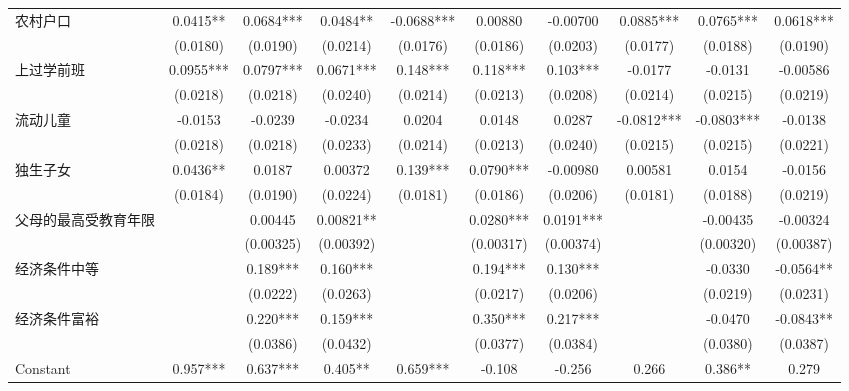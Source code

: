 \documentclass{beamer}
\begin{document}
\begin{frame}
\begin{table}[!htbp]
{\begin{tabular}{lccccccccc}
农村户口          & 0.0415**   & 0.0684***  & 0.0484**   & -0.0688*** & 0.00880    & -0.00700  & 0.0885***  & 0.0765***  & 0.0618*** \\
             & (0.0180)   & (0.0190)   & (0.0214)   & (0.0176)   & (0.0186)   & (0.0203)  & (0.0177)   & (0.0188)   & (0.0190)  \\
上过学前班        & 0.0955***  & 0.0797***  & 0.0671***  & 0.148***   & 0.118***   & 0.103***  & -0.0177    & -0.0131    & -0.00586  \\
             & (0.0218)   & (0.0218)   & (0.0240)   & (0.0214)   & (0.0213)   & (0.0208)  & (0.0214)   & (0.0215)   & (0.0219)  \\
流动儿童         & -0.0153    & -0.0239    & -0.0234    & 0.0204     & 0.0148     & 0.0287    & -0.0812*** & -0.0803*** & -0.0138   \\
             & (0.0218)   & (0.0218)   & (0.0233)   & (0.0214)   & (0.0213)   & (0.0240)  & (0.0215)   & (0.0215)   & (0.0221)  \\
独生子女         & 0.0436**   & 0.0187     & 0.00372    & 0.139***   & 0.0790***  & -0.00980  & 0.00581    & 0.0154     & -0.0156   \\
             & (0.0184)   & (0.0190)   & (0.0224)   & (0.0181)   & (0.0186)   & (0.0206)  & (0.0181)   & (0.0188)   & (0.0219)  \\
父母的最高受教育年限   &            & 0.00445    & 0.00821**  &            & 0.0280***  & 0.0191*** &            & -0.00435   & -0.00324  \\
             &            & (0.00325)  & (0.00392)  &            & (0.00317)  & (0.00374) &            & (0.00320)  & (0.00387) \\
经济条件中等       &            & 0.189***   & 0.160***   &            & 0.194***   & 0.130***  &            & -0.0330    & -0.0564** \\
             &            & (0.0222)   & (0.0263)   &            & (0.0217)   & (0.0206)  &            & (0.0219)   & (0.0231)  \\
经济条件富裕       &            & 0.220***   & 0.159***   &            & 0.350***   & 0.217***  &            & -0.0470    & -0.0843** \\
             &            & (0.0386)   & (0.0432)   &            & (0.0377)   & (0.0384)  &            & (0.0380)   & (0.0387)  \\
Constant     & 0.957***   & 0.637***   & 0.405**    & 0.659***   & -0.108     & -0.256    & 0.266      & 0.386**    & 0.279     \\

\end{tabular}}
\end{table}
\end{frame}
\end{document}
